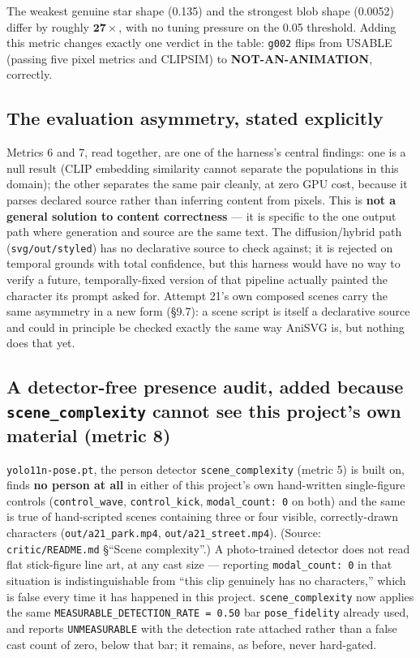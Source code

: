 \documentclass[11pt]{article}
\newcommand{\secsym}{\S}
\begin{document}
The weakest genuine star shape (0.135) and the strongest blob shape
(0.0052) differ by roughly $\mathbf{27\times}$, with no tuning pressure on
the 0.05 threshold. Adding this metric changes exactly one verdict in the
table: \texttt{g002} flips from USABLE (passing five pixel metrics and
CLIPSIM) to \textbf{NOT-AN-ANIMATION}, correctly.

\subsection{The evaluation asymmetry, stated explicitly}
\label{sec:asymmetry}

Metrics 6 and 7, read together, are one of the harness's central
findings: one is a null result (CLIP embedding similarity cannot separate
the populations in this domain); the other separates the same pair
cleanly, at zero GPU cost, because it parses declared source rather than
inferring content from pixels. This is \textbf{not a general solution to
content correctness} --- it is specific to the one output path where
generation and source are the same text. The diffusion/hybrid path
(\texttt{svg/out/styled}) has no declarative source to check against; it
is rejected on temporal grounds with total confidence, but this harness
would have no way to verify a future, temporally-fixed version of that
pipeline actually painted the character its prompt asked for. Attempt
21's own composed scenes carry the same asymmetry in a new form
(\secsym9.7): a scene script is itself a declarative source and could in
principle be checked exactly the same way AniSVG is, but nothing does
that yet.

\subsection{A detector-free presence audit, added because \texttt{scene\_complexity} cannot see this project's own material (metric 8)}
\label{sec:presenceaudit}

\texttt{yolo11n-pose.pt}, the person detector \texttt{scene\_complexity}
(metric 5) is built on, finds \textbf{no person at all} in either of this
project's own hand-written single-figure controls (\texttt{control\_wave},
\texttt{control\_kick}, \texttt{modal\_count: 0} on both) and the same is
true of hand-scripted scenes containing three or four visible,
correctly-drawn characters (\texttt{out/a21\_park.mp4},
\texttt{out/a21\_street.mp4}). (Source: \texttt{critic/README.md}
\secsym``Scene complexity''.) A photo-trained detector does not read flat
stick-figure line art, at any cast size --- reporting \texttt{modal\_count:
0} in that situation is indistinguishable from ``this clip genuinely has
no characters,'' which is false every time it has happened in this
project. \texttt{scene\_complexity} now applies the same
\texttt{MEASURABLE\_DETECTION\_RATE = 0.50} bar \texttt{pose\_fidelity}
already used, and reports \texttt{UNMEASURABLE} with the detection rate
attached rather than a false cast count of zero, below that bar; it
remains, as before, never hard-gated.
\end{document}
